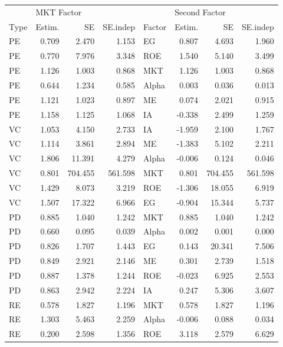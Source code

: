 \documentclass[12pt]{article}
\begin{document}
\begin{table}[ht]
	\centering
	\begin{tabular}{lrrrlrrr}
		 & \multicolumn{3}{l}{MKT Factor} & & \multicolumn{3}{l}{Second Factor} \\ 
		Type & Estim. & SE & SE.indep & Factor & Estim. & SE & SE.indep \\ 
		\hline
		\hline
PE & 0.709 & 2.470 & 1.153 & EG & 0.807 & 4.693 & 1.960 \\ 
PE & 0.770 & 7.976 & 3.348 & ROE & 1.540 & 5.140 & 3.499 \\ 
PE & 1.126 & 1.003 & 0.868 & MKT & 1.126 & 1.003 & 0.868 \\ 
PE & 0.644 & 1.234 & 0.585 & Alpha & 0.003 & 0.036 & 0.013 \\ 
PE & 1.121 & 1.023 & 0.897 & ME & 0.074 & 2.021 & 0.915 \\ 
PE & 1.158 & 1.125 & 1.068 & IA & -0.338 & 2.499 & 1.259 \\
\hline 
VC & 1.053 & 4.150 & 2.733 & IA & -1.959 & 2.100 & 1.767 \\ 
VC & 1.114 & 3.861 & 2.894 & ME & -1.383 & 5.102 & 2.211 \\ 
VC & 1.806 & 11.391 & 4.279 & Alpha & -0.006 & 0.124 & 0.046 \\ 
VC & 0.801 & 704.455 & 561.598 & MKT & 0.801 & 704.455 & 561.598 \\ 
VC & 1.429 & 8.073 & 3.219 & ROE & -1.306 & 18.055 & 6.919 \\ 
VC & 1.507 & 17.322 & 6.966 & EG & -0.904 & 15.344 & 5.737 \\ 
\hline
PD & 0.885 & 1.040 & 1.242 & MKT & 0.885 & 1.040 & 1.242 \\ 
PD & 0.660 & 0.095 & 0.039 & Alpha & 0.002 & 0.001 & 0.000 \\ 
PD & 0.826 & 1.707 & 1.443 & EG & 0.143 & 20.341 & 7.506 \\ 
PD & 0.849 & 2.921 & 2.146 & ME & 0.301 & 2.739 & 1.518 \\ 
PD & 0.887 & 1.378 & 1.244 & ROE & -0.023 & 6.925 & 2.553 \\ 
PD & 0.863 & 2.942 & 2.224 & IA & 0.247 & 5.306 & 3.607 \\ 
\hline
RE & 0.578 & 1.827 & 1.196 & MKT & 0.578 & 1.827 & 1.196 \\ 
RE & 1.303 & 5.463 & 2.259 & Alpha & -0.006 & 0.088 & 0.034 \\ 
RE & 0.200 & 2.598 & 1.356 & ROE & 3.118 & 2.579 & 6.629 \\ 

\end{tabular}
\end{table}
\end{document}

